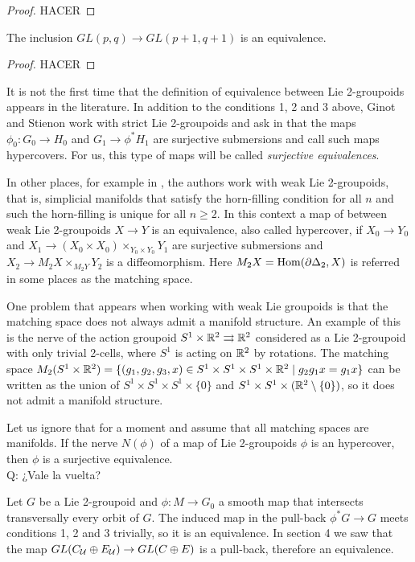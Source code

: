 \begin{proof}
HACER
\end{proof}

\begin{lemma}
The inclusion $GL(p,q) \to GL(p+1,q+1)$ is an equivalence.
\end{lemma}

\begin{proof}
HACER
\end{proof}

\medskip

It is not the first time that the definition of equivalence between Lie 2-groupoids appears in the literature.
In addition to the conditions 1, 2 and 3 above, Ginot and Stienon work with strict Lie 2-groupoids and ask in \cite{gs} that the maps $\phi_0: G_0\to H_0$ and $G_1 \to \phi^*H_1$ are surjective submersions and call such maps hypercovers.
For us, this type of maps will be called \emph{surjective equivalences}.

In other places, for example in \cite{z}, the authors work with weak Lie 2-groupoids, that is, simplicial manifolds that satisfy the horn-filling condition for all $n$ and such the horn-filling is unique for all $n\geq 2$.
In this context a map of between weak Lie 2-groupoids $X\to Y$ is an equivalence, also called hypercover, if $X_0\to Y_0$ and $X_1\to (X_0\times X_0)\times_{Y_0\times Y_0} Y_1$ are surjective submersions and $X_2\to M_2X\times_{M_2Y} Y_2$ is a diffeomorphism.
Here $M_2X = \operatorname{Hom}(\partial\Delta_2, X)$ is referred in some places as the matching space.

One problem that appears when working with weak Lie groupoids is that the matching space does not always admit a manifold structure.
An example of this is the nerve of the action groupoid $S^1\times\mathbb{R}^2 \rightrightarrows \mathbb{R}^2$ considered as a Lie 2-groupoid with only trivial 2-cells, where $S^1$ is acting on $\mathbb{R}^2$ by rotations.
The matching space
$ M_2(S^1\times\mathbb{R}^2) = \{ (g_1,g_2,g_3,x)\in S^1\times S^1\times S^1\times\mathbb{R}^2 \mid g_2g_1 x = g_1 x \} $
can be written as the union of $S^1\times S^1\times S^1\times \{0\}$ and $S^1\times S^1\times (\mathbb{R}^2\setminus \{0\})$, so it does not admit a manifold structure.

Let us ignore that for a moment and assume that all matching spaces are manifolds.
If the nerve $N(\phi)$ of a map of Lie 2-groupoids $\phi$ is an hypercover, then $\phi$ is a surjective equivalence.\\
Q: ¿Vale la vuelta?

\medskip

Let $G$ be a Lie 2-groupoid and $\phi: M\to G_0$ a smooth map that intersects transversally every orbit of $G$.
The induced map in the pull-back $\phi^*G \to G$ meets conditions 1, 2 and 3 trivially, so it is an equivalence.
In section 4 we saw that the map $GL(C_{\mathcal{U}}\oplus E_{\mathcal{U}}) \to GL(C\oplus E)$ is a pull-back, therefore an equivalence.

